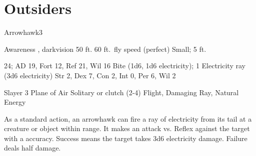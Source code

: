 \section{Outsiders}

    \begin{monsection}{Arrowhawk}{3}
        \begin{spellcontent}
            \begin{spelltargetinginfo}
                \pari {} Awareness , darkvision 50 ft.
                \pari {} 60 ft.\ fly speed (perfect)
                \pari {} Small;  5 ft.
            \end{spelltargetinginfo}
            \begin{spelleffects}
                \pari {} 24;  AD 19, Fort 12, Ref 21, Wil 16
                \pari {} Bite  (1d6, 1d6 electricity);  1
                \pari {} Electricity ray  (3d6 electricity)
                \pari {} Str 2, Dex 7, Con 2, Int 0, Per 6, Wil 2
            \end{spelleffects}
        \end{spellcontent}
        \begin{spellfooter}
            \pari {} Slayer 3
            \pari {} Plane of Air
            \pari {} Solitary or clutch (2-4)
            \pari {} Flight, Damaging Ray, Natural Energy
        \end{spellfooter}
    \end{monsection}

     As a standard action, an arrowhawk can fire a ray of electricity from its tail at a creature or object within \rngmed range.
    It makes an attack vs. Reflex against the target with a  accuracy.
    Success means the target takes 3d6 electricity damage.
    Failure deals half damage.

